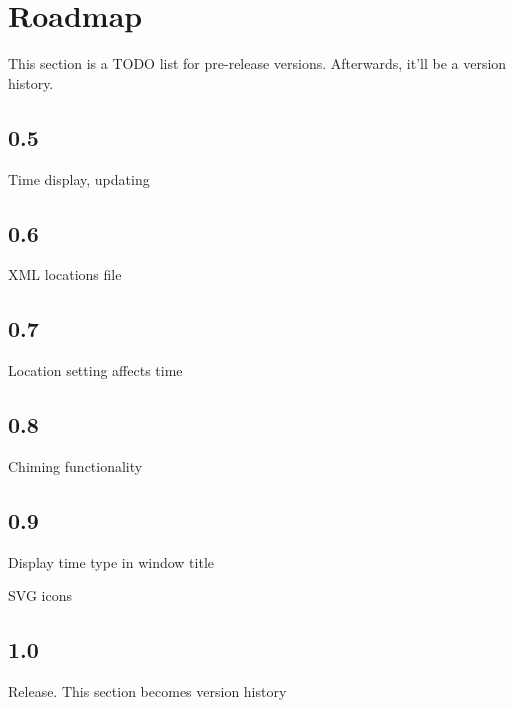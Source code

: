 \section{Roadmap}

This section is a TODO list for pre-release versions. Afterwards, it'll be a version history.


\subsection{0.5}

Time display, updating

\subsection{0.6}

XML locations file

\subsection{0.7}

Location setting affects time

\subsection{0.8}

Chiming functionality

\subsection{0.9}

Display time type in window title

SVG icons

\subsection{1.0}

Release. This section becomes version history


